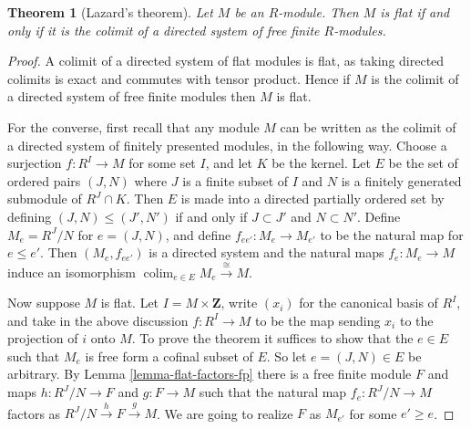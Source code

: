 \documentclass{amsart}
\theoremstyle{plain}
\newtheorem{theorem}[subsection]{Theorem}
\theoremstyle{definition}
\theoremstyle{remark}
\numberwithin{equation}{subsection}
\def\colim{\mathop{\mathrm{colim}}\nolimits}
\begin{document}
\begin{theorem}[Lazard's theorem]
\label{theorem-lazard}
Let $M$ be an $R$-module.  Then $M$ is flat if and only if it is the colimit of
a directed system of free finite $R$-modules.
\end{theorem}

\begin{proof}
A colimit of a directed system of flat modules is flat, as taking directed
colimits is exact and commutes with tensor product. Hence if $M$ is the colimit
of a directed system of free finite modules then $M$ is flat.

\medskip\noindent
For the converse, first recall that any module $M$ can be written as the
colimit of a directed system of finitely presented modules, in the following
way.  Choose a surjection $f: R^I \to M$ for some set $I$, and let $K$
be the kernel.  Let $E$ be the set of ordered pairs $(J, N)$ where $J$ is a
finite subset of $I$ and $N$ is a finitely generated submodule of $R^J \cap K$.
Then $E$ is made into a directed partially ordered set by defining $(J, N) \leq
(J', N')$ if and only if $J \subset J'$ and $N \subset N'$.  Define $M_e =
R^J/N$ for $e = (J, N)$, and define $f_{ee'}: M_e \to M_{e'}$ to be
the natural map for $e \leq e'$.  Then $(M_e, f_{ee'})$ is a directed system and
the natural maps $f_e: M_e \to M$ induce an isomorphism
$\colim_{e
\in E} M_e \xrightarrow{\cong} M$.

\medskip\noindent
Now suppose $M$ is flat.  Let $I = M \times \mathbf{Z}$, write $(x_i)$ for
the canonical basis of $R^{I}$, and take in the above discussion $f: R^I
\to M$ to be the map sending $x_i$ to the projection of $i$ onto $M$.
To prove the theorem it suffices to show that the $e \in E$ such that $M_e$
is free form a cofinal subset of $E$.  So let $e = (J, N) \in E$ be arbitrary.
By Lemma \ref{lemma-flat-factors-fp} there is a free finite module $F$ and maps
$h: R^J/N \to F$ and $g: F \to M$ such that the natural map
$f_e: R^J/N \to M$ factors as $R^J/N \xrightarrow{h} F
\xrightarrow{g} M$.  We are going to realize $F$ as $M_{e'}$ for some $e' \geq
e$.


\end{proof}
\end{document}
